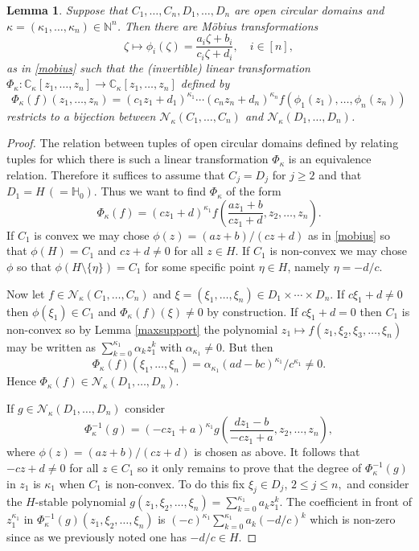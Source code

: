 \documentclass[10pt,reqno]{amsart}
\theoremstyle{plain}
\newtheorem{lemma}[theorem]{Lemma}
\theoremstyle{definition}
\theoremstyle{remark}
\numberwithin{equation}{section}
\newcommand{\NN}{\mathbb{N}}
\newcommand{\bH}{\mathbb{H}}
\newcommand{\NV}{\mathcal{N}}
\newcommand{\CC}{\mathbb{C}}
\begin{document}
\begin{lemma}\label{translate}
Suppose that $C_1, \ldots, C_n, D_1,\ldots, D_n$ are open circular domains and 
$\kappa=(\kappa_1,\ldots,\kappa_n) \in \NN^n$. Then there are M\"obius 
transformations 
\begin{equation}\label{mob-n}
\zeta\mapsto \phi_i(\zeta)=\frac{a_i\zeta+b_i}{c_i\zeta+d_i},\quad i\in [n],
\end{equation}
as in \eqref{mobius} such that the (invertible) 
linear transformation  
$\Phi_\kappa:  \CC_\kappa[z_1,\ldots, z_n] \rightarrow 
\CC_\kappa[z_1, \ldots, z_n]$ defined by 
\begin{equation}\label{Phik}
\Phi_\kappa(f)(z_1,\ldots,z_n)
=(c_1z_1+d_1)^{\kappa_1}\cdots (c_nz_n+d_n)^{\kappa_n}
f(\phi_1(z_1),\ldots,\phi_n(z_n))
\end{equation}
restricts to a bijection between $\NV_\kappa(C_1,\ldots,C_n)$ and 
$\NV_\kappa(D_1,\ldots,D_n)$. 
\end{lemma}

\begin{proof}
The relation between tuples of open circular domains defined by relating 
tuples for which there is such 
a linear transformation $\Phi_\kappa$ is an equivalence relation. Therefore it 
suffices to assume that 
$C_j=D_j$ for $j\geq 2$ and that $D_1=H\,(=\bH_0)$. Thus we want to find 
$\Phi_\kappa$ of the form 
$$
\Phi_\kappa(f)= 
(cz_1+d)^{\kappa_1} f\!\left(\frac{az_1+b}{cz_1+d},z_2,\ldots,z_n\right). 
$$
If $C_1$ is convex we may chose $\phi(z)= (az+b)/(cz+d)$ as in \eqref{mobius} 
so that $\phi(H)=C_1$ and  $cz+d \neq 0$ for all $z \in H$. If $C_1$ is 
non-convex we may chose $\phi$ so that $\phi(H\setminus\{\eta\})=C_1$ for
 some specific point $\eta \in H$, namely $\eta=-d/c$. 

Now let $f \in \NV_\kappa(C_1,\ldots,C_n)$ and  $\xi=(\xi_1,\ldots, \xi_n) \in D_1\times \cdots \times D_n$. If $c\xi_1+d \neq 0$ then $\phi(\xi_1) \in C_1$ and $\Phi_\kappa(f)(\xi)\neq 0$ by construction. If $c\xi_1+d = 0$ then $C_1$ is non-convex so by  Lemma \ref{maxsupport} the polynomial 
$z_1 \mapsto f(z_1,\xi_2, \xi_3, \ldots, \xi_n)$ may be written as 
$
\sum_{k=0}^{\kappa_1}\alpha_k z_1^k
$
with $\alpha_{\kappa_1}\neq 0$. But then 
$$
\Phi_\kappa(f)(\xi_1,\ldots, \xi_n)
= \alpha_{\kappa_1}(ad-bc)^{\kappa_1}/c^{\kappa_1} 
\neq 0. 
$$
Hence $\Phi_\kappa(f) \in \NV_\kappa(D_1,\ldots,D_n)$.

If $g \in \NV_\kappa(D_1,\ldots,D_n)$ consider 
$$
\Phi^{-1}_\kappa(g)= 
(-cz_1+a)^{\kappa_1} g\!\left(\frac{dz_1-b}{-cz_1+a},z_2,\ldots,z_n\right),
$$
where $\phi(z)=(az+b)/(cz+d)$ is chosen as above. It follows that $-cz+d \neq 0$ for all $z \in C_1$ so it only remains to prove that the degree of $\Phi^{-1}_\kappa(g)$ in $z_1$ is $\kappa_1$ when $C_1$ is non-convex. To do this fix $\xi_j \in D_j$, $2\le j\le n,$ and consider the $H$-stable polynomial 
$g(z_1,\xi_2,\ldots,\xi_n)= \sum_{k=0}^{\kappa_1}a_kz_1^k$. The coefficient in front of $z_1^{\kappa_1}$ in 
$
\Phi^{-1}_\kappa(g)(z_1,\xi_2,\ldots,\xi_n)
$
is $(-c)^{\kappa_1}\sum_{k=0}^{\kappa_1}a_k(-d/c)^k$ which is non-zero since as we previously noted one has $-d/c \in H$. 
\end{proof}
\end{document}
